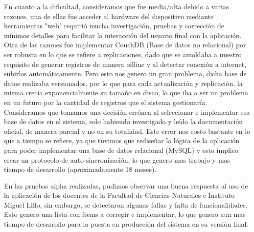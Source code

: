 En cuanto a la dificultad, consideramos que fue media/alta debido a varias razones, una de ellas fue acceder al hardware del dispositivo mediante herramientas "web" requirió mucha investigación, pruebas y corrección de mínimos detalles para facilitar la interacción del usuario final con la aplicación. Otra de las razones fue implementar CouchDB (Base de datos no relacional) por ser robusta en lo que se refiere a replicaciones, dado que se amoldaba a nuestro requisito de generar registros de manera offline y al detectar conexión a internet, subirlos automáticamente. Pero esto nos genero un gran problema, dicha base de datos realizaba versionados, por lo que para cada actualización y replicación, la misma crecía exponencialmente su tamaño en disco, lo que iba a ser un problema en un futuro por la cantidad de registros que el sistema gestionaría. Consideramos que tomamos una decisión errónea al seleccionar e implementar esa base de datos en el sistema, solo habiendo investigado y leído la documentación oficial, de manera parcial y no en su totalidad.
Este error nos costo bastante en lo que a tiempo se refiere, ya que tuvimos que rediseñar la lógica de la aplicación para poder implementar una base de datos relacional (MySQL) y esto implico crear un protocolo de auto-sincronización, lo que genero mas trabajo y mas tiempo de desarrollo (aproximadamente 18 meses).

En las pruebas alpha realizadas, pudimos observar una buena respuesta al uso de la aplicación de los docentes de la Facultad de Ciencias Naturales e Instituto Miguel Lillo, sin embargo, se detectaron algunas fallas y falta de funcionalidades. Esto genero una lista con ítems a corregir e implementar, lo que genero aun mas tiempo de desarrollo para la puesta en producción del sistema en su versión final.



